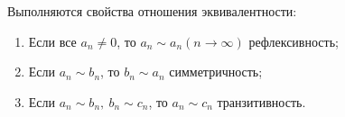 
    Выполняются свойства отношения эквивалентности:

    \begin{enumerate}
        \item Если все $a_n\neq0$, то $a_n\sim a_n (n\to \infty)$ рефлексивность;

        \item Если $a_n\sim b_n$, то $b_n\sim a_n$ симметричность;

        \item Если $a_n\sim b_n,\ b_n\sim c_n$, то $a_n\sim c_n$ транзитивность.
    \end{enumerate}
